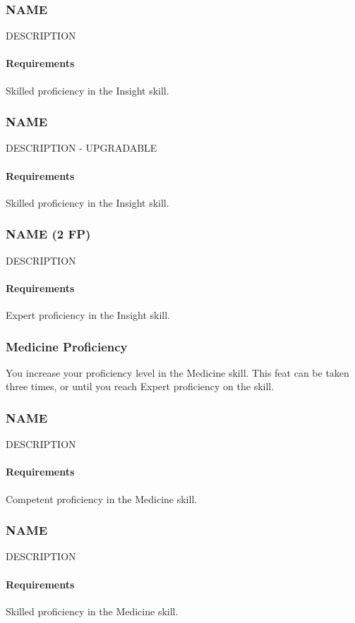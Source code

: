 \subsubsection{NAME} \label{feat::name}
    DESCRIPTION
    \paragraph{Requirements} Skilled proficiency in the Insight skill.
\subsubsection{NAME} \label{feat::name}
    DESCRIPTION - UPGRADABLE
    \paragraph{Requirements} Skilled proficiency in the Insight skill.
\subsubsection{NAME (2 FP)} \label{feat::name}
    DESCRIPTION
    \paragraph{Requirements} Expert proficiency in the Insight skill.
\subsubsection{Medicine Proficiency} \label{feat::medicineprof}
    You increase your proficiency level in the Medicine skill.
    This feat can be taken three times, or until you reach Expert proficiency on the skill.
\subsubsection{NAME} \label{feat::name}
    DESCRIPTION
    \paragraph{Requirements} Competent proficiency in the Medicine skill.
\subsubsection{NAME} \label{feat::name}
    DESCRIPTION
    \paragraph{Requirements} Skilled proficiency in the Medicine skill.
